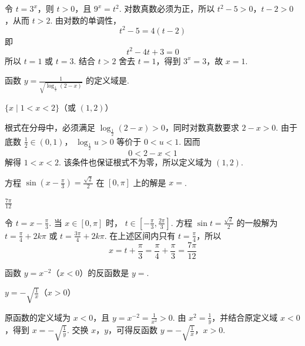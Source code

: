 \begin{solution}
令 \(t=3^x\)，则 \(t>0\)，且 \(9^x=t^2\). 对数真数必须为正，所以
\(t^2-5>0\)，\(t-2>0\)，从而 \(t>2\). 由对数的单调性，
\[
t^2-5=4(t-2)
\]
即
\[
t^2-4t+3=0
\]
所以 \(t=1\) 或 \(t=3\). 结合 \(t>2\) 舍去 \(t=1\)，得到 \(3^x=3\)，故 \(x=1\).
\end{solution}

\begin{problem}
函数 \(y=\frac{1}{\sqrt{\log_{\frac{1}{2}}(2-x)}}\) 的定义域是\fillinblank{}.
\end{problem}

\begin{answer}
\(\{x \mid 1 < x < 2\}\)（或 \((1,2)\)）
\end{answer}

\begin{solution}
根式在分母中，必须满足
\(\log_{\frac{1}{2}}(2-x)>0\)，同时对数真数要求 \(2-x>0\). 由于底数 \(\frac{1}{2}\in(0,1)\)，
\(\log_{\frac{1}{2}}u>0\) 等价于 \(0<u<1\). 因而
\[
0<2-x<1
\]
解得 \(1<x<2\). 该条件也保证根式不为零，所以定义域为 \((1,2)\).
\end{solution}

\begin{problem}
方程 \(\sin\left(x-\frac{\pi}{3}\right)=\frac{\sqrt{2}}{2}\) 在 \([0,\pi]\) 上的解是 \(x=\)\fillinblank{}.
\end{problem}

\begin{answer}
\(\frac{7\pi}{12}\)
\end{answer}

\begin{solution}
令 \(t=x-\frac{\pi}{3}\). 当 \(x\in[0,\pi]\) 时，
\(t\in\left[-\frac{\pi}{3},\frac{2\pi}{3}\right]\). 方程
\(\sin t=\frac{\sqrt{2}}{2}\) 的一般解为
\(t=\frac{\pi}{4}+2k\pi\) 或 \(t=\frac{3\pi}{4}+2k\pi\). 在上述区间内只有
\(t=\frac{\pi}{4}\)，所以
\[
x=t+\frac{\pi}{3}=\frac{\pi}{4}+\frac{\pi}{3}=\frac{7\pi}{12}
\]
\end{solution}

\begin{problem}
函数 \(y=x^{-2}\)（\(x<0\)）的反函数是 \(y=\)\fillinblank{}.
\end{problem}

\begin{answer}
\(y=-\sqrt{\frac{1}{x}}\)（\(x>0\)）
\end{answer}

\begin{solution}
原函数的定义域为 \(x<0\)，且 \(y=x^{-2}=\frac{1}{x^2}>0\). 由
\(x^2=\frac{1}{y}\)，并结合原定义域 \(x<0\)，得到
\(x=-\sqrt{\frac{1}{y}}\). 交换 \(x\)，\(y\)，可得反函数
\(y=-\sqrt{\frac{1}{x}}\)，\(x>0\).
\end{solution}

